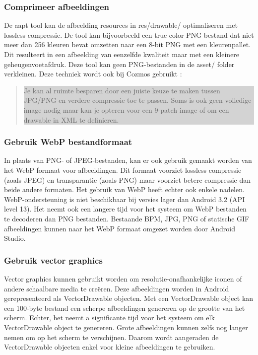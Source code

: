 \subsubsection{Comprimeer afbeeldingen }
\label{sec:compressimages}
De aapt tool kan de afbeelding resources in res/drawable/ optimaliseren met lossless compressie. De tool kan bijvoorbeeld een true-color PNG bestand dat niet meer dan 256 kleuren bevat omzetten naar een 8-bit PNG met een kleurenpallet. Dit resulteert in een afbeelding van eenzelfde kwaliteit maar met een kleinere geheugenvoetafdruk. Deze tool kan geen PNG-bestanden in de asset/ folder verkleinen. Deze techniek wordt ook bij Cozmos gebruikt : 
\begin{quote}
\colorbox{lightgray}{\parbox{350px}{Je kan al ruimte besparen door een juiste keuze te maken tussen JPG/PNG en verdere compressie toe te passen. Soms is ook geen volledige image nodig maar kan je opteren voor een 9-patch image of om een drawable in XML te definieren.}}
\end{quote}

\subsubsection{Gebruik WebP bestandformaat }
\label{sec:webp}
In plaats van PNG- of JPEG-bestanden, kan er ook gebruik gemaakt worden van het WebP formaat voor afbeeldingen. Dit formaat voorziet lossless compressie (zoals JPEG) en transparantie (zoals PNG) maar voorziet betere compressie dan beide andere formaten. Het gebruik van WebP heeft echter ook enkele nadelen. WebP-ondersteuning is niet beschikbaar bij versies lager dan Android 3.2 (API level 13). Het neemt ook een langere tijd voor het systeem om WebP bestanden te decoderen dan PNG bestanden. Bestaande BPM, JPG, PNG of statische GIF afbeeldingen kunnen naar het WebP formaat omgezet worden door Android Studio. 

\subsubsection{Gebruik vector graphics }
\label{sec:vectorgraphics}
Vector graphics kunnen gebruikt worden om resolutie-onafhankelijke iconen of andere schaalbare media te creëren. Deze afbeeldingen worden in Android gerepresenteerd als VectorDrawable objecten. Met een VectorDrawable object kan een 100-byte bestand een scherpe afbeeldingen genereren op de grootte van het scherm. 
Echter, het neemt a significante tijd voor het systeem om elk VectorDrawable object te genereren. Grote afbeeldingen kunnen zelfs nog langer nemen om op het scherm te verschijnen. Daarom wordt aangeraden de VectorDrawable objecten enkel voor kleine afbeeldingen te gebruiken. 

